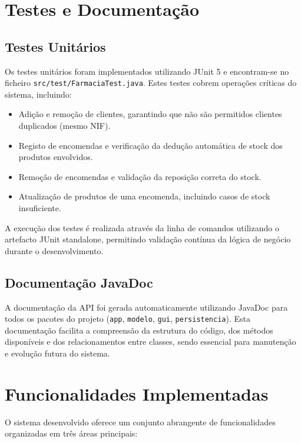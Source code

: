 \documentclass[a4paper,12pt]{article}
\begin{document}
\newpage

\section{Testes e Documentação}

\subsection{Testes Unitários}
Os testes unitários foram implementados utilizando JUnit 5 e encontram-se no ficheiro \texttt{src/test/FarmaciaTest.java}. Estes testes cobrem operações críticas do sistema, incluindo:

\begin{itemize}
    \item Adição e remoção de clientes, garantindo que não são permitidos clientes duplicados (mesmo NIF).
    \item Registo de encomendas e verificação da dedução automática de stock dos produtos envolvidos.
    \item Remoção de encomendas e validação da reposição correta do stock.
    \item Atualização de produtos de uma encomenda, incluindo casos de stock insuficiente.
\end{itemize}

A execução dos testes é realizada através da linha de comandos utilizando o artefacto JUnit standalone, permitindo validação contínua da lógica de negócio durante o desenvolvimento.

\subsection{Documentação JavaDoc}
A documentação da API foi gerada automaticamente utilizando JavaDoc para todos os pacotes do projeto (\texttt{app}, \texttt{modelo}, \texttt{gui}, \texttt{persistencia}). Esta documentação facilita a compreensão da estrutura do código, dos métodos disponíveis e dos relacionamentos entre classes, sendo essencial para manutenção e evolução futura do sistema.

\newpage

\section{Funcionalidades Implementadas}

O sistema desenvolvido oferece um conjunto abrangente de funcionalidades organizadas em três áreas principais:
\end{document}
